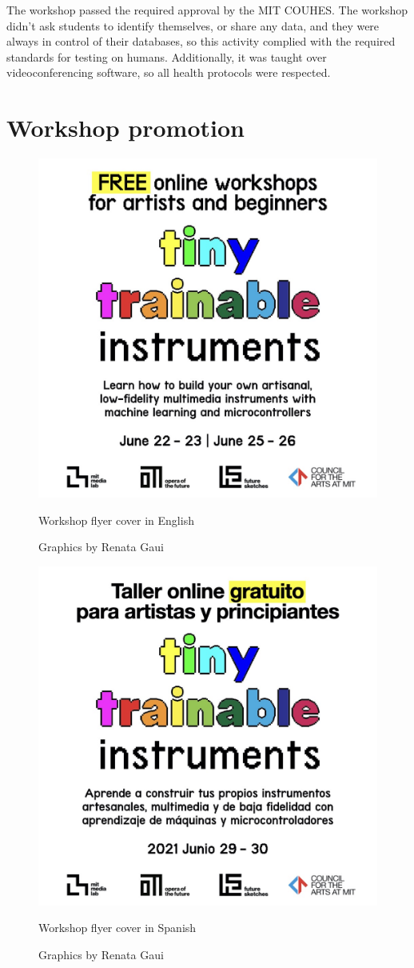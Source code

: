 The workshop passed the required approval by the \acrshort{MIT} \acrfull{COUHES}. The workshop didn't ask students to identify themselves, or share any data, and they were always in control of their databases, so this activity complied with the required standards for testing on humans. Additionally, it was taught over videoconferencing software, so all health protocols were respected.

\section{Workshop promotion}


\begin{figure}[ht]
  \centering
  \includegraphics[width=0.75\linewidth,height=0.35\textheight,keepaspectratio]{images/workshop-en-1.jpg}
  \caption{Workshop flyer cover in English}
  \caption*{Graphics by Renata Gaui}
  \label{fig:workshop-english-flyer-page-1}
\end{figure}

\begin{figure}[ht]
  \centering
  \includegraphics[width=0.75\linewidth,height=0.35\textheight,keepaspectratio]{images/workshop-es-1.jpg}
  \caption{Workshop flyer cover in Spanish}
  \caption*{Graphics by Renata Gaui}
  \label{fig:workshop-spanish-flyer-page-1}
\end{figure}



